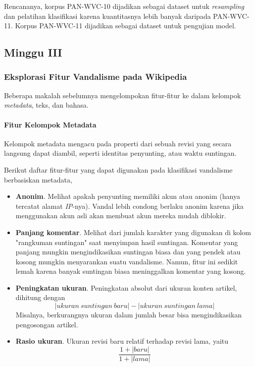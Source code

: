 \documentclass[12pt,a4paper,titlepage]{article}
\begin{document}
Rencananya, korpus PAN-WVC-10 dijadikan sebagai dataset untuk \textit{resampling} dan pelatihan klasifikasi karena kuantitasnya lebih banyak daripada PAN-WVC-11.
Korpus PAN-WVC-11 dijadikan sebagai dataset untuk pengujian model.

\subsection{Minggu III}

\subsubsection{Eksplorasi Fitur Vandalisme pada Wikipedia}

Beberapa makalah sebelumnya mengelompokan fitur-fitur ke dalam kelompok \textit{metadata}, teks, dan bahasa.

\paragraph{Fitur Kelompok Metadata}

Kelompok metadata mengacu pada properti dari sebuah revisi yang secara langsung dapat diambil, seperti identitas penyunting, atau waktu suntingan.

Berikut daftar fitur-fitur yang dapat digunakan pada klasifikasi vandalisme berbasiskan metadata,

\begin{itemize}
\item \textbf{Anonim}.
Melihat apakah penyunting memiliki akun atau anonim (hanya tercatat alamat \textit{IP}-nya).
Vandal lebih condong berlaku anonim karena jika menggunakan akun asli akan membuat akun mereka mudah diblokir.

\item \textbf{Panjang komentar}.
Melihat dari jumlah karakter yang digunakan di kolom "rangkuman suntingan" saat menyimpan hasil suntingan.
Komentar yang panjang mungkin mengindikasikan suntingan biasa dan yang pendek atau kosong mungkin menyarankan suatu vandalisme.
Namun, fitur ini sedikit lemah karena banyak suntingan biasa meninggalkan komentar yang kosong.

\item \textbf{Peningkatan ukuran}.
Peningkatan absolut dari ukuran konten artikel, dihitung dengan
\[
|ukuran\ suntingan\ baru| - |ukuran\ suntingan\ lama|
\]
Misalnya, berkurangnya ukuran dalam jumlah besar bisa mengindikasikan pengosongan artikel.

\item \textbf{Rasio ukuran}.
Ukuran revisi baru relatif terhadap revisi lama, yaitu
\[
\frac{1 + |baru|}{1 + |lama|}
\]

\end{itemize}
\end{document}
